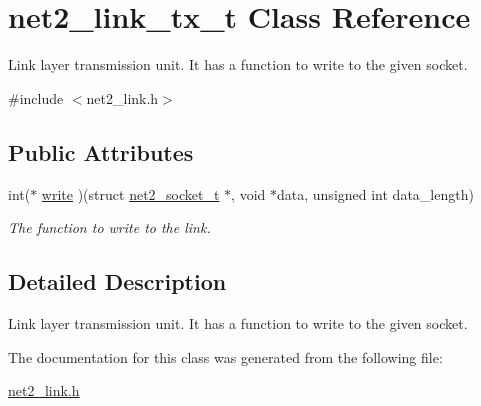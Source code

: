 \hypertarget{structnet2__link__tx__t}{\section{net2\-\_\-link\-\_\-tx\-\_\-t Class Reference}
\label{structnet2__link__tx__t}
}


Link layer transmission unit. It has a function to write to the given socket.  




{\ttfamily \#include $<$net2\-\_\-link.\-h$>$}

\subsection*{Public Attributes}
\begin{DoxyCompactItemize}
\item 
\hypertarget{structnet2__link__tx__t_a3ee6fe19309869057a034bfdc5824df9}{int($\ast$ \hyperlink{structnet2__link__tx__t_a3ee6fe19309869057a034bfdc5824df9}{write} )(struct \hyperlink{structnet2__socket__t}{net2\-\_\-socket\-\_\-t} $\ast$, void $\ast$data, unsigned int data\-\_\-length)}\label{structnet2__link__tx__t_a3ee6fe19309869057a034bfdc5824df9}

\begin{DoxyCompactList}\small\item\em The function to write to the link. \end{DoxyCompactList}\end{DoxyCompactItemize}


\subsection{Detailed Description}
Link layer transmission unit. It has a function to write to the given socket. 

The documentation for this class was generated from the following file\-:\begin{DoxyCompactItemize}
\item 
\hyperlink{net2__link_8h}{net2\-\_\-link.\-h}\end{DoxyCompactItemize}

